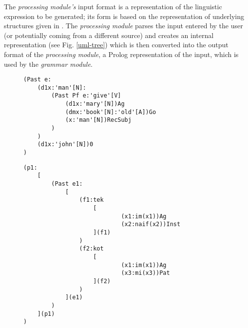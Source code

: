 \documentclass[a4paper, halfparskip, onecolumn, abstracton, final, figurecaptionabove]{scrartcl}
\begin{document}
The \emph{processing module's} input format is a representation of the linguistic expression to be generated; its form is based on the representation of underlying structures given in \cite{Dik1997a}. The \emph{processing module} parses the input entered by the user (or potentially coming from a different source) and creates an internal representation (see Fig. \ref{uml-tree}) which is then converted into the output format of the \emph{processing module}, a Prolog representation of the input, which is used by the \emph{grammar module}.

\begin{figure}
    \begin{center}

\begin{verbatim}
(Past e:
    (d1x:'man'[N]:
        (Past Pf e:'give'[V]
            (d1x:'mary'[N])Ag  
            (dmx:'book'[N]:'old'[A])Go
            (x:'man'[N])RecSubj
        )
    )
    (d1x:'john'[N])0
)
\end{verbatim}


\label{antlr-input}

    \end{center}
    \end{figure}
    
    \begin{figure}
     \begin{center}
  
\begin{verbatim}
(p1: 
    [ 
        (Past e1: 
            [
                (f1:tek 
                    [
                            (x1:im(x1))Ag
                            (x2:naif(x2))Inst
                    ](f1)
                )
                (f2:kot 
                    [
                            (x1:im(x1))Ag
                            (x3:mi(x3))Pat
                    ](f2)
                )
            ](e1)
        )
    ](p1)
)
\end{verbatim}


\label{fdg-rl}  
\end{center}
\end{figure}
\end{document}
